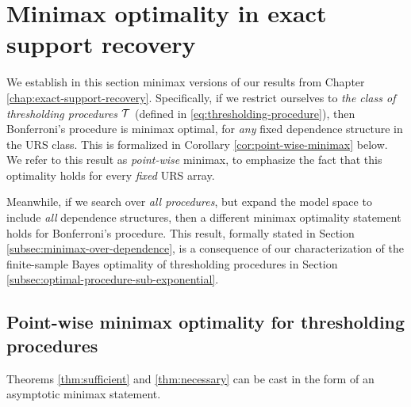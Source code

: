 \section{Minimax optimality in exact support recovery} \label{sec:minimax}

We establish in this section minimax versions of our results from Chapter \ref{chap:exact-support-recovery}.
Specifically, if we restrict ourselves to \emph{the class of thresholding procedures} $\cal T$ (defined in \eqref{eq:thresholding-procedure}), then Bonferroni's procedure is minimax optimal, for \emph{any} fixed dependence structure in the URS class.
This is formalized in Corollary \ref{cor:point-wise-minimax} below.%
We refer to this result as \emph{point-wise} minimax, to emphasize the fact that this optimality holds for every \emph{fixed} URS array.

Meanwhile, if we search over \emph{all procedures}, but expand the model space to include {\em all} dependence 
structures, then a different minimax optimality statement holds for Bonferroni's procedure.
This result, formally stated in Section \ref{subsec:minimax-over-dependence}, is a consequence of our characterization 
of the finite-sample Bayes optimality of thresholding procedures in Section \ref{subsec:optimal-procedure-sub-exponential}.


\subsection{Point-wise minimax optimality for thresholding procedures}
\label{subsec:point-wise-minimax}

Theorems \ref{thm:sufficient} and \ref{thm:necessary} can be cast in the form of an asymptotic minimax statement. 

